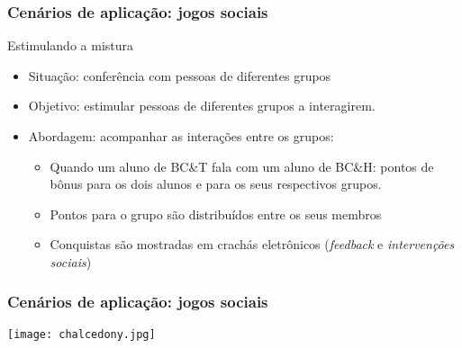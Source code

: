 \documentclass[Ligatures=TeX,table,brazil,svgnames,usetotalslideindicator,compress,10pt]{beamer}
\begin{document}
\begin{frame}
  \frametitle{Cenários de aplicação: jogos sociais}
  \begin{block}{Estimulando a mistura}
    \begin{itemize}
    \item \alert{Situação:} conferência com pessoas de diferentes grupos
    \item \alert{Objetivo:} estimular pessoas de diferentes grupos a interagirem.
    \item \alert{Abordagem:} acompanhar as interações entre os grupos:
    \begin{itemize}
    \item Quando um aluno de BC\&T fala com um aluno de BC\&H: pontos de bônus para os dois alunos e para os seus respectivos grupos.
    \item Pontos para o grupo são distribuídos entre os seus membros
    \item Conquistas são mostradas em crachás eletrônicos (\emph{feedback} e \emph{intervenções sociais})
    \end{itemize}
    \end{itemize}
  \end{block}
\end{frame}

\begin{frame}
  \frametitle{Cenários de aplicação: jogos sociais}

  \begin{center}
    \texttt{[image: chalcedony.jpg]}
  \end{center}
\end{frame}  





\end{document}
